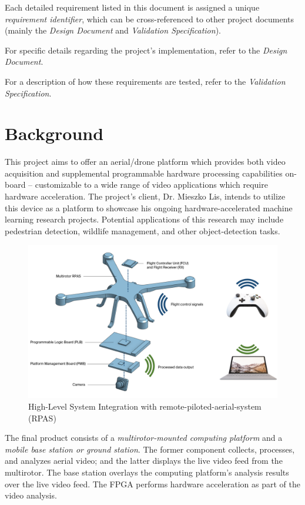 \documentclass[10pt,letterpaper]{article}
\begin{document}
Each detailed requirement listed in this document is assigned a unique \textit{requirement identifier}, which can be cross-referenced to other project documents (mainly the \textit{Design Document} and \textit{Validation Specification}). 

For specific details regarding the project's implementation, refer to the \textit{Design Document}.

For a description of how these requirements are tested, refer to the \textit{Validation Specification}.

\newpage
\section{Background}

This project aims to offer an aerial/drone platform which provides both video acquisition and supplemental programmable hardware processing capabilities on-board -- customizable to a wide range of video applications which require hardware acceleration. The project's client, Dr. Mieszko Lis, intends to utilize this device as a platform to showcase his ongoing hardware-accelerated machine learning research projects. Potential applications of this research may include pedestrian detection, wildlife management, and other object-detection tasks.

\begin{figure}[H]
    \centering
    \includegraphics[width=\linewidth]{intpic.png}
\caption{High-Level System Integration with remote-piloted-aerial-system (RPAS)}
\label{hlpic}
\end{figure}

The final product consists of a \textit{multirotor-mounted computing platform} and a \textit{mobile base station or ground station}. The former component collects, processes, and analyzes aerial video; and the latter displays the live video feed from the multirotor. The base station overlays the computing platform's analysis results over the live video feed. The FPGA performs hardware acceleration as part of the video analysis.
\end{document}

